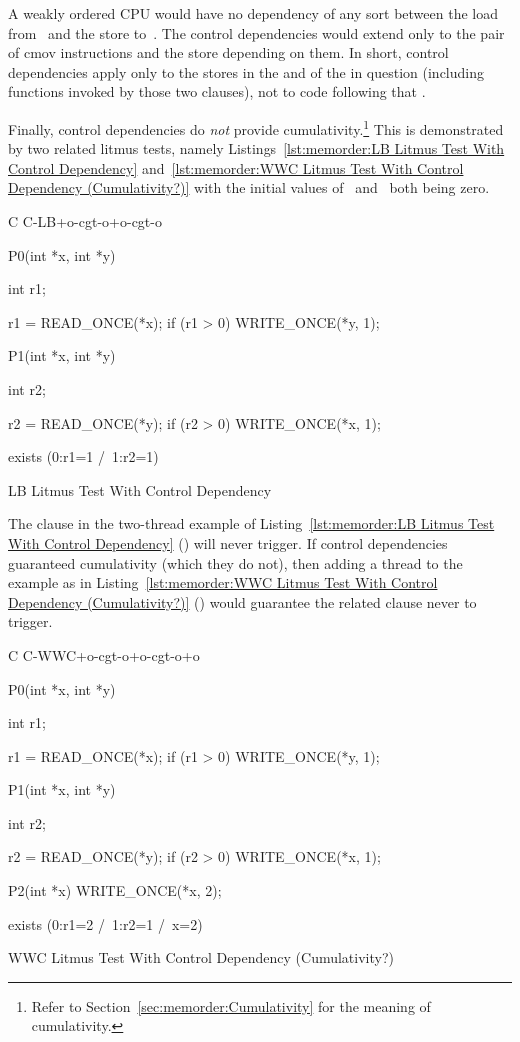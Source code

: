 A weakly ordered CPU would have no dependency of any sort between the load
from~ and the store to~.
The control dependencies would extend
only to the pair of cmov instructions and the store depending on them.
In short, control dependencies apply only to the stores in the 
and  of the  in question (including functions
invoked by those two clauses), not to code following that .

Finally, control dependencies do \emph{not} provide cumulativity.\footnote{
	Refer to Section~\ref{sec:memorder:Cumulativity} for
	the meaning of cumulativity.}
This is demonstrated by two related litmus tests, namely
Listings~\ref{lst:memorder:LB Litmus Test With Control Dependency}
and~\ref{lst:memorder:WWC Litmus Test With Control Dependency (Cumulativity?)}
with the initial values
of~ and~ both being zero.
\fi

\begin{listing}[tb]
{ \scriptsize
\begin{verbbox}[\LstLineNo]
C C-LB+o-cgt-o+o-cgt-o
{
}

P0(int *x, int *y)
{
  int r1;

  r1 = READ_ONCE(*x);
  if (r1 > 0)
    WRITE_ONCE(*y, 1);
}

P1(int *x, int *y)
{
  int r2;

  r2 = READ_ONCE(*y);
  if (r2 > 0)
    WRITE_ONCE(*x, 1);
}

exists (0:r1=1 /\ 1:r2=1)
\end{verbbox}
}
\centering
\theverbbox
\caption{LB Litmus Test With Control Dependency}
\label{lst:memorder:LB Litmus Test With Control Dependency}
\end{listing}

The  clause in the two-thread example of
Listing~\ref{lst:memorder:LB Litmus Test With Control Dependency}
()
will never trigger.
If control dependencies guaranteed cumulativity (which they do
not), then adding a thread to the example as in
Listing~\ref{lst:memorder:WWC Litmus Test With Control Dependency (Cumulativity?)}
()
would guarantee the related  clause never to trigger.

\begin{listing}
{ \scriptsize
\begin{verbbox}[\LstLineNo]
C C-WWC+o-cgt-o+o-cgt-o+o
{
}

P0(int *x, int *y)
{
  int r1;

  r1 = READ_ONCE(*x);
  if (r1 > 0)
    WRITE_ONCE(*y, 1);
}

P1(int *x, int *y)
{
  int r2;

  r2 = READ_ONCE(*y);
  if (r2 > 0)
    WRITE_ONCE(*x, 1);
}

P2(int *x)
{
  WRITE_ONCE(*x, 2);
}

exists (0:r1=2 /\ 1:r2=1 /\ x=2)
\end{verbbox}
}
\centering
\theverbbox
\caption{WWC Litmus Test With Control Dependency (Cumulativity?)}
\label{lst:memorder:WWC Litmus Test With Control Dependency (Cumulativity?)}
\end{listing}


